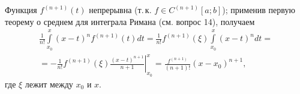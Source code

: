 \begin{solution}
    Функция $f^{(n + 1)}(t)$ непрерывна (т.\,к. $f \in C^{(n + 1)}[a; b]$); применив первую теорему о среднем для интеграла Римана (см. вопрос 14), получаем
    \begin{multline*}
        \frac{1}{n!}\int\limits_{x_0}^x(x - t)^nf^{(n + 1)}(t)dt = \frac{1}{n!}f^{(n + 1)}(\xi)\int\limits_{x_0}^x(x - t)^ndt =\\ = -\frac{1}{n!}f^{(n + 1)}(\xi)\left.\frac{(x - t)^{n + 1}}{n + 1}\right|_{x_0}^x = \frac{f^{(n + 1)}}{(n + 1)!}(x - x_0)^{n + 1},
    \end{multline*}
    где $\xi$ лежит между $x_0$ и $x$.
\end{solution}

